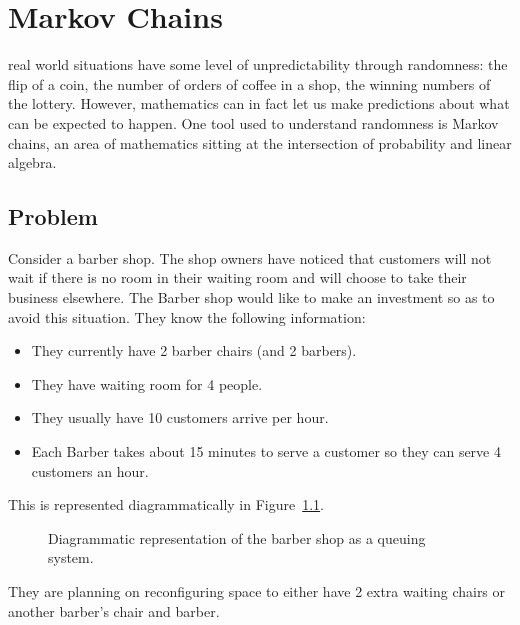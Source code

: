 \chapter[Markov Chains]{Markov Chains}

 real world situations have some level of
unpredictability through randomness: the flip of a coin, the number of orders of
coffee in a shop, the winning numbers of the lottery. However, mathematics can
in fact let us make predictions about what can be expected to happen. One tool used to
understand randomness is Markov chains, an area of mathematics sitting at the
intersection of probability and linear algebra.

\section{Problem}\label{sec:problem}

Consider a barber shop. The shop owners have noticed that customers will not
wait if there is no room in their waiting room and will choose to take their
business elsewhere. The Barber shop would like to make an investment so as to
avoid this situation. They know the following information:

\begin{itemize}
    \item They currently have 2 barber chairs (and 2 barbers).
    \item They have waiting room for 4 people.
    \item They usually have 10 customers arrive per hour.
    \item Each Barber takes about 15 minutes to serve a customer so they can
        serve 4 customers an hour.
\end{itemize}

This is represented diagrammatically in Figure~\ref{fig:barber-shop}.

\begin{figure}[!hbtp]
    \begin{center}
    
    \end{center}
    \caption{Diagrammatic representation of the barber shop as a queuing system.}
    \label{fig:barber-shop}
\end{figure}


They are planning on
reconfiguring space to either have 2 extra waiting chairs or
another barber's chair and barber.


